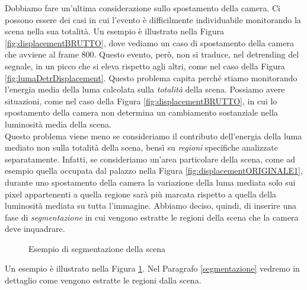Dobbiamo fare un'ultima considerazione sullo spostamento della camera.
Ci possono essere dei casi in cui l'evento \`e difficilmente individuabile monitorando la scena nella sua totalit\`a.
Un esempio \`e illustrato nella Figura \ref{fig:displacementBRUTTO}, dove vediamo un caso di spostamento della camera che avviene al frame $800$.
Questo evento, per\`o, non si traduce, nel detrending del segnale, in un picco che si eleva rispetto agli altri, come nel caso della Figura \ref{fig:lumaDetrDisplacement}.
Questo problema capita perch\'e stiamo monitorando l'energia media della luma calcolata sulla \textit{totalit\`a} della scena.
Possiamo avere situazioni, come nel caso della Figura \ref{fig:displacementBRUTTO}, in cui lo spostamento della camera non determina un cambiamento sostanziale nella luminosit\`a media della scena.\\
Questo problema viene meno se consideriamo il contributo dell'energia della luma mediato non sulla totalit\`a della scena, bens\`i su \textit{regioni} specifiche analizzate separatamente.
Infatti, se consideriamo un'area particolare della scena, come ad esempio quella occupata dal palazzo nella Figura \ref{fig:displacementORIGINALE1}, durante uno spostamento della camera la variazione della luma mediata solo sui pixel appartenenti a quella regione sar\`a pi\`u marcata rispetto a quella della luminosit\`a mediata su tutta l'immagine.
Abbiamo deciso, quindi, di inserire una fase di \textit{segmentazione} in cui vengono estratte le regioni della scena che la camera deve inquadrare.
 \begin{figure}[tb]
 	\centering
 	\caption{Esempio di segmentazione della scena}
 	\label{fig:testiSEGMENTAZIONE}
 \end{figure}
Un esempio \`e illustrato nella Figura \ref{fig:testiSEGMENTAZIONE}. 
Nel Paragrafo \ref{segmentazione} vedremo in dettaglio come vengono estratte le regioni dalla scena.
